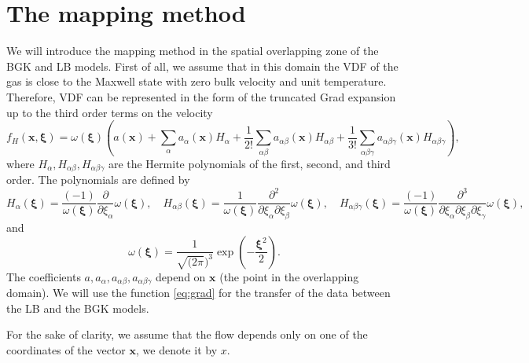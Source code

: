 \documentclass[]{elsarticle} %
\newcommand{\bxi}{\boldsymbol{\xi}}
\newcommand{\bx}{\boldsymbol{x}}
\newcommand{\ai}{a_{\alpha}}
\newcommand{\aij}{a_{\alpha\beta}}
\newcommand{\aijk}{a_{\alpha\beta\gamma}}
\newcommand{\Hi}{H_{\alpha}}
\newcommand{\Hij}{H_{\alpha\beta}}
\newcommand{\Hijk}{H_{\alpha\beta\gamma}}
\begin{document}

\section{The mapping method}\label{sec:mapping}

We will introduce the mapping method in the spatial overlapping zone of the BGK and LB models.
First of all, we assume that in this domain the VDF of the gas is close to the Maxwell state with zero bulk velocity and unit temperature.
Therefore, VDF can be represented in the form of the truncated Grad expansion up to the third order terms on the velocity
\begin{equation}\label{eq:grad}
    f_H(\bx,\bxi) = \omega(\bxi)\left(a(\bx) +\sum_{\alpha}\ai(\bx)\Hi+\frac{1}{2!}\sum_{\alpha\beta}
    \aij(\bx)\Hij+\frac{1}{3!}\sum_{\alpha\beta \gamma}\aijk(\bx)\Hijk\right),
\end{equation}
where $\Hi, \Hij, \Hijk$ are the Hermite polynomials of the first, second, and third order. The polynomials are defined by
\begin{equation}
H_\alpha(\bxi)=\frac{(-1)}{\omega(\bxi)}\frac{\partial}{\partial \xi_\alpha}\omega(\bxi),  \quad \Hij(\bxi)=\frac{1}{\omega(\bxi)}\frac{\partial^2}{\partial \xi_\alpha\partial \xi_\beta}\omega(\bxi),
\quad \Hijk(\bxi)=\frac{(-1)}{\omega(\bxi)}
\frac{\partial^3}{\partial \xi_\alpha\partial \xi_\beta \partial \xi_\gamma}\omega(\bxi),
\end{equation}
and
\begin{equation}
 \omega(\bxi)= \frac{1}{\sqrt{(2\pi})^3}\exp\left(-\frac{\bxi^2}{2}\right).
\end{equation}
 The coefficients $a, \ai,\aij, \aijk$ depend on $\bx$ (the point in the overlapping domain).
 We will use the function \eqref{eq:grad} for the transfer of the data between the LB and the BGK models.

For the sake of clarity, we assume that the flow depends only on one of the coordinates of the vector $\bx$, we denote it by $x$.
\end{document}

